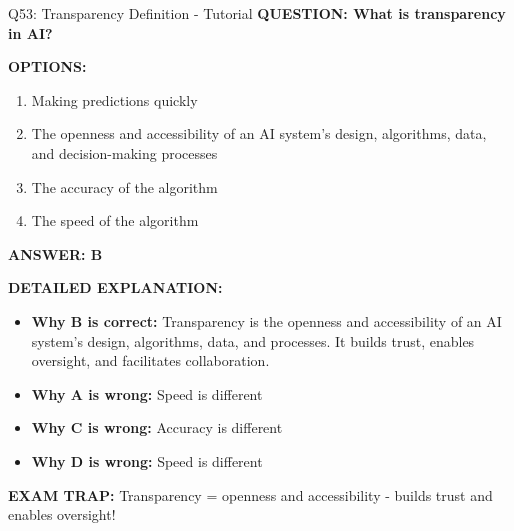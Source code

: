 \documentclass[8pt]{beamer}
\begin{document}
	\begin{frame}{Q53: Transparency Definition - Tutorial}
		\fontsize{6.5}{7.5}\selectfont
		\textbf{QUESTION: What is transparency in AI?}
		
		\vspace{0.1cm}
		\textbf{OPTIONS:}
		\begin{enumerate}
			\item Making predictions quickly
			\item The openness and accessibility of an AI system's design, algorithms, data, and decision-making processes
			\item The accuracy of the algorithm
			\item The speed of the algorithm
		\end{enumerate}
		
		\vspace{0.1cm}
		\textcolor{myblue}{\textbf{ANSWER: B}}
		
		\vspace{0.1cm}
		\textbf{DETAILED EXPLANATION:}
		\begin{itemize}
			\item \textbf{Why B is correct:} Transparency is the openness and accessibility of an AI system's design, algorithms, data, and processes. It builds trust, enables oversight, and facilitates collaboration.
			\item \textbf{Why A is wrong:} Speed is different
			\item \textbf{Why C is wrong:} Accuracy is different
			\item \textbf{Why D is wrong:} Speed is different
		\end{itemize}
		
		\textcolor{myred}{\textbf{EXAM TRAP:}} Transparency = \textcolor{myblue}{openness and accessibility} - builds trust and enables oversight!
	\end{frame}
	
\end{document}
